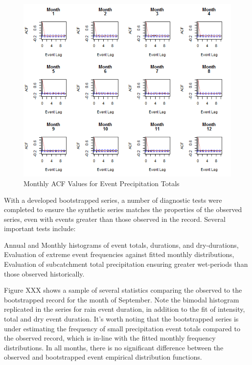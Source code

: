 \documentclass[11pt]{article} %
\begin{document}
 \begin{figure}%
\center
\noindent\includegraphics[scale=.7]{./Figures/ACF_Monthly_Totals} 
\caption[]{Monthly ACF Values for Event Precipitation Totals}
\label{MonthlyACFTotal}	
\end{figure}

With a developed bootstrapped series, a number of diagnostic tests were completed to ensure the synthetic series matches the properties of the observed series, even with events greater than those observed in the record. Several important tests include:

	Annual and Monthly histograms of event totals, durations, and dry-durations,
	Evaluation of extreme event frequencies against fitted monthly distributions,
	Evaluation of subcatchment total precipitation ensuring greater wet-periods than those observed historically.

Figure XXX shows a sample of several statistics comparing the observed to the bootstrapped record for the month of September. Note the bimodal histogram replicated in the series for rain event duration, in addition to the fit of intensity, total and dry event duration. It’s worth noting that the bootstrapped series is under estimating the frequency of small precipitation event totals compared to the observed record, which is in-line with the fitted monthly frequency distributions. In all months, there is no significant difference between the observed and bootstrapped event empirical distribution functions.
\end{document}
